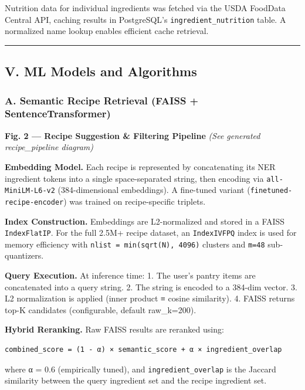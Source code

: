 \documentclass[
  10pt,
]{article}
\begin{document}
Nutrition data for individual ingredients was fetched via the USDA
FoodData Central API, caching results in PostgreSQL's
\texttt{ingredient\_nutrition} table. A normalized name lookup enables
efficient cache retrieval.

\begin{center}\rule{0.5\linewidth}{0.5pt}\end{center}

\subsection{V. ML Models and
Algorithms}\label{v.-ml-models-and-algorithms}

\subsubsection{A. Semantic Recipe Retrieval (FAISS +
SentenceTransformer)}\label{a.-semantic-recipe-retrieval-faiss-sentencetransformer}

\textbf{Fig. 2 --- Recipe Suggestion \& Filtering Pipeline} \emph{(See
generated recipe\_pipeline diagram)}

\textbf{Embedding Model.} Each recipe is represented by concatenating
its NER ingredient tokens into a single space-separated string, then
encoding via \texttt{all-MiniLM-L6-v2} (384-dimensional embeddings). A
fine-tuned variant (\texttt{finetuned-recipe-encoder}) was trained on
recipe-specific triplets.

\textbf{Index Construction.} Embeddings are L2-normalized and stored in
a FAISS \texttt{IndexFlatIP}. For the full 2.5M+ recipe dataset, an
\texttt{IndexIVFPQ} index is used for memory efficiency with
\texttt{nlist\ =\ min(sqrt(N),\ 4096)} clusters and \texttt{m=48}
sub-quantizers.

\textbf{Query Execution.} At inference time: 1. The user's pantry items
are concatenated into a query string. 2. The string is encoded to a
384-dim vector. 3. L2 normalization is applied (inner product ≡ cosine
similarity). 4. FAISS returns top-K candidates (configurable, default
raw\_k=200).

\textbf{Hybrid Reranking.} Raw FAISS results are reranked using:

\begin{verbatim}
combined_score = (1 - α) × semantic_score + α × ingredient_overlap
\end{verbatim}

where α = 0.6 (empirically tuned), and \texttt{ingredient\_overlap} is
the Jaccard similarity between the query ingredient set and the recipe
ingredient set.
\end{document}

